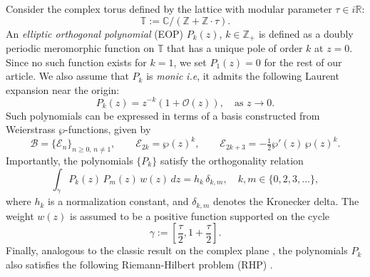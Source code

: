 \documentclass[11pt,a4paper]{article}
\theoremstyle{definition}
\numberwithin{equation}{section}
\numberwithin{theorem}{section}
\begin{document}
Consider the complex torus defined by the lattice with modular parameter \( \tau \in i\mathbb{R} \):
\begin{equation*}
    \mathbb{T} := \mathbb{C} / (\mathbb{Z} + \mathbb{Z} \cdot \tau).
\end{equation*}
An \emph{elliptic orthogonal polynomial} (EOP) \( P_k(z) \), $k\in \mathbb{Z}_{+}$ is defined as a doubly periodic meromorphic function on \( \mathbb{T} \) that has a unique pole of order \( k \) at $z=0$. Since no such function exists for $k=1$, we set $P_{1}(z)=0$ for the rest of our article. We also assume that \( P_k \) is \emph{monic} {\it i.e},  it admits the following Laurent expansion near the origin:
\begin{equation}
    P_k(z) = z^{-k}\left(1 + \mathcal{O}(z)\right), \quad \text{as } z \to 0.
\end{equation}
Such polynomials can be expressed in terms of a basis constructed from Weierstrass \( \wp \)-functions, given by
\begin{equation}
    \mathcal{B} = \{ \mathcal{E}_n \}_{n \geq 0,\, n \neq 1}, \qquad 
    \mathcal{E}_{2k} = \wp(z)^k, \qquad 
    \mathcal{E}_{2k+3} = -\tfrac{1}{2} \wp'(z)\, \wp(z)^k.
\end{equation}
Importantly, the polynomials \( \{ P_k \} \) satisfy the orthogonality relation
\begin{equation}
    \int_{\gamma}  P_k(z)\, P_m(z)\, {w}(z)\, dz = h_k\, \delta_{k,m}, \quad k, m \in \{0,2,3,\dots\},
\end{equation}
where \( h_k \) is a normalization constant, and \( \delta_{k,m} \) denotes the Kronecker delta.
The weight \( {w}(z) \) is assumed to be a positive function supported on the cycle
\[
    \gamma := \left[ \frac{\tau}{2}, 1 + \frac{\tau}{2} \right].
\]
Finally, analogous to the classic result on the complex plane \cite{fokas1992isomonodromy}, the polynomials $P_{k}$ also satisfies the following Riemann-Hilbert problem (RHP) \cite{DLR24,bertola2022nonlinear}.
\end{document}

